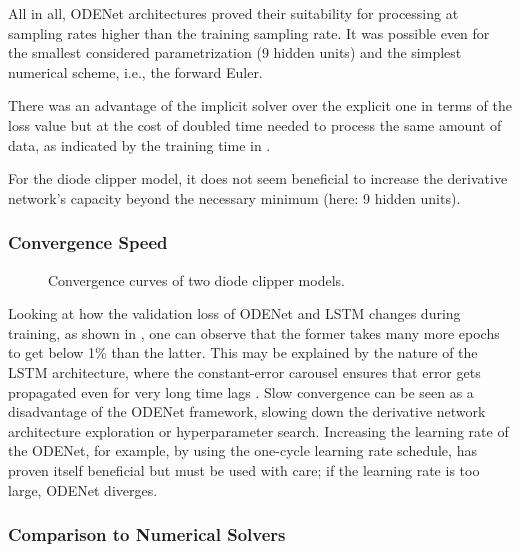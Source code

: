 All in all, ODENet architectures proved their suitability for processing at sampling rates higher than the training sampling rate. It was possible even for the smallest considered parametrization (9 hidden units) and the simplest numerical scheme, i.e., the forward Euler. 

There was an advantage of the implicit solver over the explicit one in terms of the loss value but at the cost of doubled time needed to process the same amount of data, as indicated by the training time in . 

For the diode clipper model, it does not seem beneficial to increase the derivative network's capacity beyond the necessary minimum (here: 9 hidden units). 

\subsubsection{Convergence Speed}

\begin{figure}
    \centering
    
    \caption{Convergence curves of two diode clipper models.}
    \label{fig:diode_clipper_validation_curves}
\end{figure}

Looking at how the validation loss of ODENet and LSTM changes during training, as shown in , one can observe that the former takes many more epochs to get below 1\% than the latter. This may be explained by the nature of the \ac{LSTM} architecture, where the constant-error carousel ensures that error gets propagated even for very long time lags \cite{Hochreiter1997}. Slow convergence can be seen as a disadvantage of the ODENet framework, slowing down the derivative network architecture exploration or hyperparameter search. Increasing the learning rate of the ODENet, for example, by using the one-cycle learning rate schedule, has proven itself beneficial but must be used with care; if the learning rate is too large, ODENet diverges.

\subsubsection{Comparison to Numerical Solvers}

